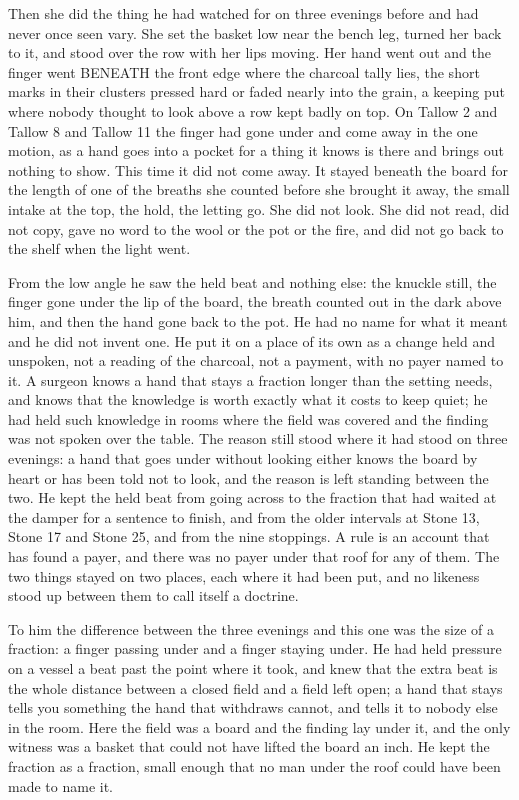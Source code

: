 Then she did the thing he had watched for on three evenings before and had never once seen vary. She set the basket low near the bench leg, turned her back to it, and stood over the row with her lips moving. Her hand went out and the finger went BENEATH the front edge where the charcoal tally lies, the short marks in their clusters pressed hard or faded nearly into the grain, a keeping put where nobody thought to look above a row kept badly on top. On Tallow 2 and Tallow 8 and Tallow 11 the finger had gone under and come away in the one motion, as a hand goes into a pocket for a thing it knows is there and brings out nothing to show. This time it did not come away. It stayed beneath the board for the length of one of the breaths she counted before she brought it away, the small intake at the top, the hold, the letting go. She did not look. She did not read, did not copy, gave no word to the wool or the pot or the fire, and did not go back to the shelf when the light went.

From the low angle he saw the held beat and nothing else: the knuckle still, the finger gone under the lip of the board, the breath counted out in the dark above him, and then the hand gone back to the pot. He had no name for what it meant and he did not invent one. He put it on a place of its own as a change held and unspoken, not a reading of the charcoal, not a payment, with no payer named to it. A surgeon knows a hand that stays a fraction longer than the setting needs, and knows that the knowledge is worth exactly what it costs to keep quiet; he had held such knowledge in rooms where the field was covered and the finding was not spoken over the table. The reason still stood where it had stood on three evenings: a hand that goes under without looking either knows the board by heart or has been told not to look, and the reason is left standing between the two. He kept the held beat from going across to the fraction that had waited at the damper for a sentence to finish, and from the older intervals at Stone 13, Stone 17 and Stone 25, and from the nine stoppings. A rule is an account that has found a payer, and there was no payer under that roof for any of them. The two things stayed on two places, each where it had been put, and no likeness stood up between them to call itself a doctrine.

To him the difference between the three evenings and this one was the size of a fraction: a finger passing under and a finger staying under. He had held pressure on a vessel a beat past the point where it took, and knew that the extra beat is the whole distance between a closed field and a field left open; a hand that stays tells you something the hand that withdraws cannot, and tells it to nobody else in the room. Here the field was a board and the finding lay under it, and the only witness was a basket that could not have lifted the board an inch. He kept the fraction as a fraction, small enough that no man under the roof could have been made to name it.

